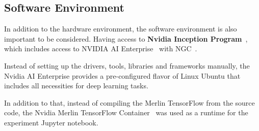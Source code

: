 \subsection{Software Environment}

In addition to the hardware environment, the software environment is also important to be considered.
Having access to \textbf{Nvidia Inception Program}~\cite{NvidiaStartups}, 
which includes access to NVIDIA AI Enterprise~\cite{NvidiaAiEnterprise} with NGC~\cite{NvidiaNGC}.

Instead of setting up the drivers, tools, libraries and frameworks manually, 
the Nvidia AI Enterprise provides a pre-configured flavor of Linux Ubuntu that includes all necessities for deep learning tasks.

In addition to that, instead of compiling the Merlin TensorFlow from the source code, 
the Nvidia Merlin TensorFlow Container~\cite{NvidiaMerlinTf} was used as a runtime for the experiment Jupyter notebook.

